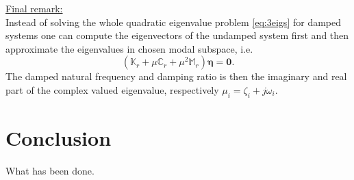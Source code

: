 \documentclass[conference]{journal}%
\newcommand{\bb}[1]{\mathbb{#1}}
\newcommand{\B}[1]{\mathbf{#1}}
\newcommand{\Beta}{\boldsymbol{\eta}}
\begin{document}
	\underline{Final remark:}\\ Instead of solving the whole quadratic eigenvalue problem \eqref{eq:3eigs} for damped systems one can compute the eigenvectors of the undamped system first and then approximate the eigenvalues in chosen modal subspace, i.e.
	\begin{equation}
	(\bb{K}_r + \mu \bb{C}_r + \mu^2 \bb{M}_r) \Beta = \B{0}.
	\end{equation}  
	The damped natural frequency and damping ratio is then the imaginary and real part of the complex valued eigenvalue, respectively $\mu_i = \zeta_i + j \omega_i$.
	
	\section{Conclusion}
	What has been done.
	
	
	
\end{document}
